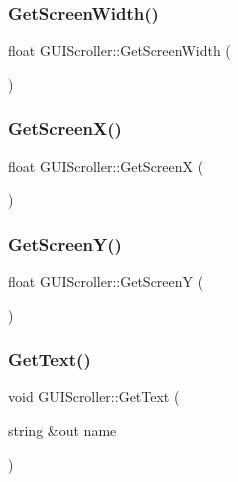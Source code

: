 \hypertarget{class_g_u_i_scroller_a59da17b023aae3a7343503a83b7f9f8d}{}\label{class_g_u_i_scroller_a59da17b023aae3a7343503a83b7f9f8d} 
\subsubsection{\texorpdfstring{Get\+Screen\+Width()}{GetScreenWidth()}}
{\footnotesize\ttfamily float G\+U\+I\+Scroller\+::\+Get\+Screen\+Width (\begin{DoxyParamCaption}{ }\end{DoxyParamCaption})}

\hypertarget{class_g_u_i_scroller_a81ca8fa869688a11e4ddaed7ae1d8853}{}\label{class_g_u_i_scroller_a81ca8fa869688a11e4ddaed7ae1d8853} 
\subsubsection{\texorpdfstring{Get\+Screen\+X()}{GetScreenX()}}
{\footnotesize\ttfamily float G\+U\+I\+Scroller\+::\+Get\+ScreenX (\begin{DoxyParamCaption}{ }\end{DoxyParamCaption})}

\hypertarget{class_g_u_i_scroller_aef60f9e24061559b2bc5db477fc174a5}{}\label{class_g_u_i_scroller_aef60f9e24061559b2bc5db477fc174a5} 
\subsubsection{\texorpdfstring{Get\+Screen\+Y()}{GetScreenY()}}
{\footnotesize\ttfamily float G\+U\+I\+Scroller\+::\+Get\+ScreenY (\begin{DoxyParamCaption}{ }\end{DoxyParamCaption})}

\hypertarget{class_g_u_i_scroller_a5dec94428de712b7f728f3e3d5f1dea6}{}\label{class_g_u_i_scroller_a5dec94428de712b7f728f3e3d5f1dea6} 
\subsubsection{\texorpdfstring{Get\+Text()}{GetText()}}
{\footnotesize\ttfamily void G\+U\+I\+Scroller\+::\+Get\+Text (\begin{DoxyParamCaption}\item[{string \&out}]{name }\end{DoxyParamCaption})}

